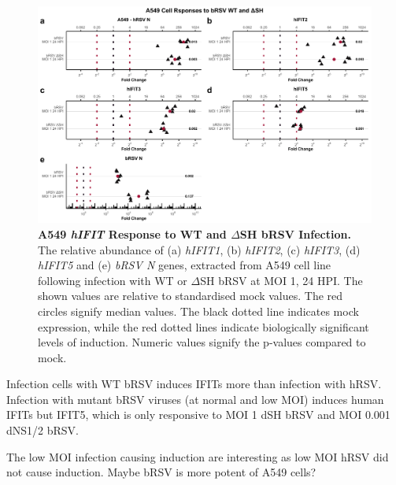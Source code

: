 \begin{figure}
    \centering
    \includegraphics[width=1\linewidth]{06. Chapter 1/Figs/01. Induction/07. a549_brsv_moi1.pdf}
    \caption[A549 \textit{hIFIT} Response to WT and \(\Delta\)SH bRSV Infection.]{\textbf{A549 \textit{hIFIT} Response to WT and \(\Delta\)SH bRSV Infection.} The relative abundance of (a) \textit{hIFIT1}, (b) \textit{hIFIT2}, (c) \textit{hIFIT3}, (d) \textit{hIFIT5} and (e) \textit{bRSV N} genes, extracted from A549 cell line following infection with WT or \(\Delta\)SH bRSV at MOI 1, 24 HPI.  The shown values are relative to standardised mock values. The red circles signify median values. The black dotted line indicates mock expression, while the red dotted lines indicate biologically significant levels of induction. Numeric values signify the p-values compared to mock.}
    \label{Responses of A549 to bRSV WT and dSH.}
\end{figure}



Infection cells with WT bRSV induces IFITs more than infection with hRSV.  Infection with mutant bRSV viruses (at normal and low MOI) induces human IFITs but IFIT5, which is only responsive to MOI 1 dSH bRSV and MOI 0.001 dNS1/2 bRSV.

The low MOI infection causing induction are interesting as low MOI hRSV did not cause induction. Maybe bRSV is more potent of A549 cells?

